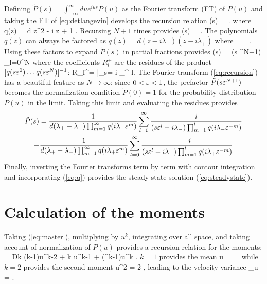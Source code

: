Defining $\tilde{P}(s) = \int_{-\infty}^\infty du e^{i u s} P(u) $ as the Fourier transform (FT) of $P(u)$ and taking the FT of \ref{eq:detlangevin} develops the recursion relation
\be {}(s) = . \ee
where
\be q(z) = d z^2 - i \gamma z + 1 . \label{eq:q} \ee
Recursing $N+1$ times provides
\be {}(s) = .\label{eq:recursion}\ee
The polynomials $q(z)$ can always be factored as $q(z) = d(z - i\lambda_-)(z - i\lambda_+)$ where
\be \lambda_\pm = .\ee
Using these factors to expand $\tilde{P}(s)$ in partial fractions provides
\be {}(s)  = (s \ve^{N+1}) \sum_{l=0}^N   \ee
where the coefficients $R_l^\pm$ are the residues of the product $[q(s\varepsilon^0)\dots q(s\varepsilon^N)]^{-1}$:
\be R_l^\pm =  \Big|_{s= i \lambda_\pm \ve^{-l}}.\ee
The Fourier transform (\ref{eq:recursion}) has a beautiful feature as $N\rightarrow \infty$: since $0<\varepsilon <1$, the prefactor $\tilde{P}( s \varepsilon^{N+1})$ becomes the normalization condition $\tilde{P}(0)=1$ for the probability distribution $P(u)$ in the limit.
Taking this limit and evaluating the residues provides 
\begin{multline} \tilde{P}(s) = \frac{1}{d(\lambda_+ - \lambda_-) \prod_{m=1}^\infty q(i \lambda_- \varepsilon^m)} \sum_{l=0}^\infty \frac{i}{(s\varepsilon^l-i\lambda_-)\prod_{m=1}^l q(i\lambda_- \varepsilon^{-m})} 
	\\+ \frac{1}{d(\lambda_+ - \lambda_-) \prod_{m=1}^\infty q(i \lambda_+ \varepsilon^m)} \sum_{l=0}^\infty \frac{-i}{(s\varepsilon^l-i \lambda_+)\prod_{m=1}^l q(i\lambda_+ \varepsilon^{-m})} \end{multline}
Finally, inverting the Fourier transforms term by term with contour integration and incorporating (\ref{eq:q}) provides the steady-state solution (\ref{eq:steadystate}).

\section{Calculation of the moments}
Taking (\ref{eq:master}), multiplying by $u^k$, integrating over all space, and taking account of normalization of $P(u)$ provides a recursion relation for the moments: 
 = Dk (k-1)\langle u^{k-2} \rangle + \Gamma k \langle u^{k-1} \rangle + \nu (\ve^k-1)\langle u^k \rangle. \ee
$k=1$ provides the mean
\be \langle u \rangle =  = \ee
while $k=2$ provides the second moment
\be \langle u^2 \rangle = 2 , \ee
leading to the velocity variance
\be \sigma_u = .\ee
